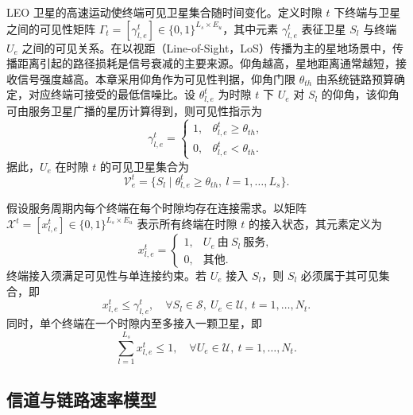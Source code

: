LEO 卫星的高速运动使终端可见卫星集合随时间变化。定义时隙 $t$ 下终端与卫星之间的可见性矩阵 $\Gamma_t=[\gamma_{l,e}^t]\in\{0,1\}^{L_s\times E_u}$，其中元素 $\gamma_{l,e}^t$ 表征卫星 $S_l$ 与终端 $U_e$ 之间的可见关系。在以视距（Line-of-Sight，LoS）传播为主的星地场景中，传播距离引起的路径损耗是信号衰减的主要来源。仰角越高，星地距离通常越短，接收信号强度越高。本章采用仰角作为可见性判据，仰角门限 $\theta_{th}$ 由系统链路预算确定，对应终端可接受的最低信噪比。设 $\theta_{l,e}^t$ 为时隙 $t$ 下 $U_e$ 对 $S_l$ 的仰角，该仰角可由服务卫星广播的星历计算得到，则可见性指示为
\begin{equation}\label{eq:ch3_visibility}
\gamma_{l,e}^t=
\begin{cases}
1, & \theta_{l,e}^t\geqslant\theta_{th},\\[2pt]
0, & \theta_{l,e}^t<\theta_{th}.
\end{cases}
\end{equation}
据此，$U_e$ 在时隙 $t$ 的可见卫星集合为
\begin{equation}\label{eq:ch3_visset}
\mathcal{V}_e^t=\{S_l\mid \theta_{l,e}^t\geqslant\theta_{th},~l=1,\dots,L_s\}.
\end{equation}

假设服务周期内每个终端在每个时隙均存在连接需求。以矩阵 $\mathcal{X}^t=[x_{l,e}^t]\in\{0,1\}^{L_s\times E_u}$ 表示所有终端在时隙 $t$ 的接入状态，其元素定义为
\begin{equation}\label{eq:ch3_connection}
x_{l,e}^t=
\begin{cases}
1, & U_e~\text{由}~S_l~\text{服务},\\[2pt]
0, & \text{其他}.
\end{cases}
\end{equation}
终端接入须满足可见性与单连接约束。若 $U_e$ 接入 $S_l$，则 $S_l$ 必须属于其可见集合，即
\begin{equation}\label{eq:ch3_visible_conn}
x_{l,e}^t\leqslant\gamma_{l,e}^t,\quad\forall S_l\in\mathcal{S},~U_e\in\mathcal{U},~t=1,\dots,N_t.
\end{equation}
同时，单个终端在一个时隙内至多接入一颗卫星，即
\begin{equation}\label{eq:ch3_single_conn}
\sum_{l=1}^{L_s}x_{l,e}^t\leqslant 1,\quad\forall U_e\in\mathcal{U},~t=1,\dots,N_t.
\end{equation}

\subsection{信道与链路速率模型}
\label{subsec:ch3_channel}

